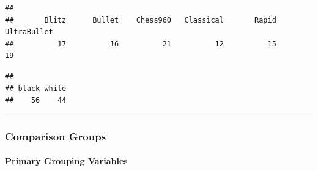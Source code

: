\documentclass[
]{article}
\newenvironment{Shaded}{\begin{snugshade}}{\end{snugshade}}
\newcommand{\FunctionTok}[1]{\textcolor[rgb]{0.13,0.29,0.53}{\textbf{#1}}}
\newcommand{\NormalTok}[1]{#1}
\newcommand{\SpecialCharTok}[1]{\textcolor[rgb]{0.81,0.36,0.00}{\textbf{#1}}}
\begin{document}
\begin{verbatim}
## 
##       Blitz      Bullet    Chess960   Classical       Rapid UltraBullet 
##          17          16          21          12          15          19
\end{verbatim}

\begin{Shaded}
\end{Shaded}

\begin{verbatim}
## 
## black white 
##    56    44
\end{verbatim}

\begin{center}\rule{0.5\linewidth}{0.5pt}\end{center}

\subsubsection{Comparison Groups}\label{comparison-groups}

\paragraph{Primary Grouping Variables}\label{primary-grouping-variables}
\end{document}
